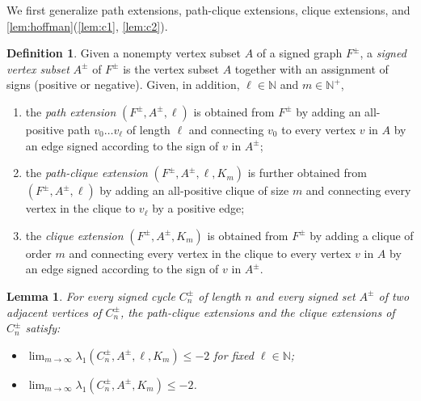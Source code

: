 \documentclass[11pt]{article}
\newtheorem{lemma}[theorem]{Lemma}
\theoremstyle{definition}
\newtheorem{definition}[theorem]{Definition}
\theoremstyle{remark}
\newcommand{\la}{\lambda}
\newcommand{\N}{\mathbb{N}}
\begin{document}
We first generalize path extensions, path-clique extensions, clique extensions, and \cref{lem:hoffman}(\ref{lem:c1}, \ref{lem:c2}).

\begin{definition}
    Given a nonempty vertex subset $A$ of a signed graph $F^\pm$, a \emph{signed vertex subset} $A^\pm$ of $F^\pm$ is the vertex subset $A$ together with an assignment of signs (positive or negative). Given, in addition, $\ell \in \N$ and $m \in \N^+$,
    \begin{enumerate}[label=(\alph*)]
        \item the \emph{path extension} $(F^\pm, A^\pm, \ell)$ is obtained from $F^\pm$ by adding an all-positive path $v_0 \dots v_\ell$ of length $\ell$ and connecting $v_0$ to every vertex $v$ in $A$ by an edge signed according to the sign of $v$ in $A^\pm$;
        \item the \emph{path-clique extension} $(F^\pm, A^\pm, \ell, K_m)$ is further obtained from $(F^\pm, A^\pm, \ell)$ by adding an all-positive clique of size $m$ and connecting every vertex in the clique to $v_\ell$ by a positive edge;
        \item the \emph{clique extension} $(F^\pm, A^\pm, K_m)$ is obtained from $F^\pm$ by adding a clique of order $m$ and connecting every vertex in the clique to every vertex $v$ in $A$ by an edge signed according to the sign of $v$ in $A^\pm$.
    \end{enumerate}
\end{definition}

\begin{lemma} \label{lem:hoffman-signed}
    For every signed cycle $C^\pm_n$ of length $n$ and every signed set $A^\pm$ of two adjacent vertices of $C^\pm_n$, the path-clique extensions and the clique extensions of $C^\pm_n$ satisfy:
    \begin{itemize}
        \item[(c1)] $\lim_{m\to\infty} \la_1(C_n^\pm, A^\pm, \ell, K_m) \le -2$ for fixed $\ell \in \N$;
        \item[(c2)] $\lim_{m\to\infty} \la_1(C_n^\pm, A^\pm, K_m) \le -2$.
    \end{itemize}
\end{lemma}
\end{document}
